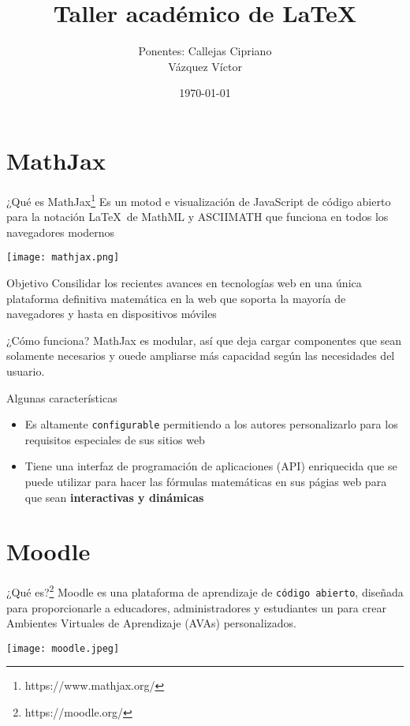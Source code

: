 \documentclass{beamer}
\title{Taller académico de \LaTeX}
\author{Ponentes: Callejas Cipriano\\ Vázquez Víctor}
\institute{FLISoL\\ FES Acatlán, UNAM}
\date{\small{\today}}
\begin{document}
\frame{\titlepage}
\frame{\tableofcontents}
\section{MathJax}
\begin{frame}{¿Qué es MathJax\footnote{https://www.mathjax.org/}}
\justify
Es un motod e visualización de JavaScript de código abierto para la notación \LaTeX\, de MathML y ASCIIMATH que funciona en todos 
los navegadores modernos
\begin{center}
 \texttt{[image: mathjax.png]}
\end{center}


\end{frame}
\begin{frame}{Objetivo}
 \justify
Consilidar los recientes avances en tecnologías web en una única plataforma definitiva matemática en la web que soporta la 
mayoría de navegadores y hasta en dispositivos móviles
\end{frame}
\begin{frame}{¿Cómo funciona?}
 MathJax es modular, así que deja cargar componentes que sean solamente necesarios y ouede ampliarse más capacidad según las 
necesidades del usuario.
\end{frame}
\begin{frame}{Algunas características}
\justify
\begin{itemize}
 \item Es altamente \texttt{configurable} permitiendo a los autores personalizarlo para los requisitos especiales de sus sitios 
web
\item Tiene una interfaz de programación de aplicaciones (API) enriquecida que se puede utilizar para hacer las fórmulas 
matemáticas en sus págias web para que sean \textbf{interactivas y dinámicas}
\end{itemize}
\end{frame}
\section{Moodle}
\begin{frame}{¿Qué es?\footnote{https://moodle.org/}}
\justify
Moodle es una plataforma de aprendizaje de \texttt{código abierto}, diseñada para proporcionarle a educadores, administradores y 
estudiantes un  para crear Ambientes Virtuales de Aprendizaje (AVAs)
personalizados.
\begin{center}
 \texttt{[image: moodle.jpeg]}
\end{center}
\end{frame}
\end{document}
